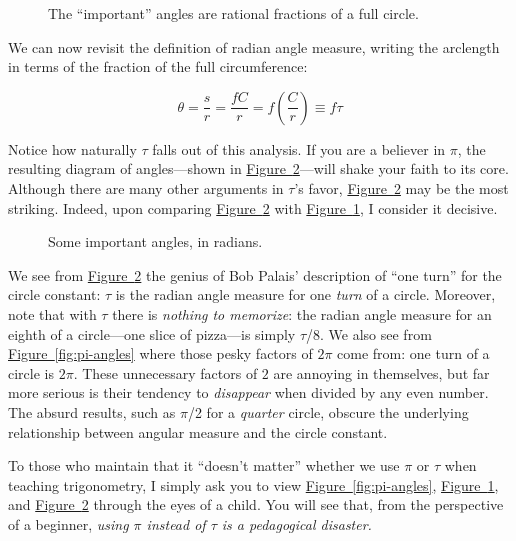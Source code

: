 \documentclass{article}
\begin{document}
\begin{figure}
\begin{center}
\end{center}
\caption{The ``important'' angles are rational fractions of a full circle.\label{fig:angle-fractions}}
\end{figure}

\noindent We can now revisit the definition of radian angle measure, writing the arclength in terms of the fraction of the full circumference:

\[ \theta = \frac{s}{r} = \frac{fC}{r} =  f\left(\frac{C}{r}\right) \equiv f\tau \]

\noindent Notice how naturally $\tau$ falls out of this analysis. If you are a believer in $\pi$, the resulting diagram of angles---shown in \hyperref[fig:tau-angles]{Figure~}\ref{fig:tau-angles}---will shake your faith to its core. Although there are many other arguments in $\tau$'s favor, \hyperref[fig:tau-angles]{Figure~}\ref{fig:tau-angles} may be the most striking. Indeed, upon comparing \hyperref[fig:tau-angles]{Figure~}\ref{fig:tau-angles} with \hyperref[fig:angle-fractions]{Figure~}\ref{fig:angle-fractions}, I consider it decisive.

\begin{figure}
\begin{center}
\end{center}
\caption{Some important angles, in radians.\label{fig:tau-angles}}
\end{figure}

We see from \hyperref[fig:tau-angles]{Figure~}\ref{fig:tau-angles} the genius of Bob Palais' description of ``one turn'' for the circle constant: $\tau$ is the radian angle measure for one \emph{turn} of a circle. Moreover, note that with $\tau$ there is \emph{nothing to memorize}: the radian angle measure for an eighth of a circle---one slice of pizza---is simply $\tau$/8. We also see from \hyperref[fig:pi-angles]{Figure~}\ref{fig:pi-angles} where those pesky factors of $2\pi$ come from: one turn of a circle is $2\pi$. These unnecessary factors of $2$ are annoying in themselves, but far more serious is their tendency to \emph{disappear} when divided by any even number. The absurd results, such as $\pi$/2 for a \emph{quarter} circle, obscure the underlying relationship between angular measure and the circle constant.

To those who maintain that it ``doesn't matter'' whether we use $\pi$ or $\tau$ when teaching trigonometry, I simply ask you to view \hyperref[fig:pi-angles]{Figure~}\ref{fig:pi-angles}, \hyperref[fig:angle-fractions]{Figure~}\ref{fig:angle-fractions}, and \hyperref[fig:tau-angles]{Figure~}\ref{fig:tau-angles} through the eyes of a child. You will see that, from the perspective of a beginner, \emph{using $\pi$ instead of $\tau$ is a pedagogical disaster.}
\end{document}
